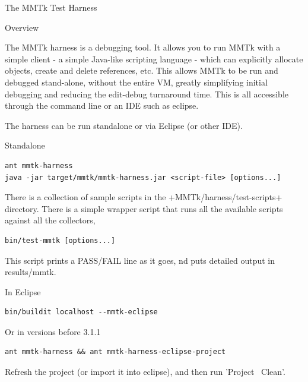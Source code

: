 \begin{section}{The MMTk Test Harness}
\label{sec:themmtktestharness}

\begin{subsection}{Overview}

The MMTk harness is a debugging tool. It allows you to run MMTk with a simple client - a simple Java-like scripting language - which can explicitly allocate objects, create and delete references, etc. This allows MMTk to be run and debugged stand-alone, without the entire VM, greatly simplifying initial debugging and reducing the edit-debug turnaround time. This is all accessible through the command line or an IDE such as eclipse.

The harness can be run standalone or via Eclipse (or other IDE).

\end{subsection}

\begin{subsection}{Standalone}

\begin{lstlisting}
ant mmtk-harness
java -jar target/mmtk/mmtk-harness.jar <script-file> [options...]
\end{lstlisting}

There is a collection of sample scripts in the \spverb+MMTk/harness/test-scripts+ directory.  There is a simple wrapper script that runs all the available scripts against all the collectors,

\begin{lstlisting}
bin/test-mmtk [options...]
\end{lstlisting}

This script prints a PASS/FAIL line as it goes, nd puts detailed output in results/mmtk.

\end{subsection}

\begin{subsection}{In Eclipse}

\begin{lstlisting}
bin/buildit localhost --mmtk-eclipse
\end{lstlisting}

Or in versions before 3.1.1

\begin{lstlisting}
ant mmtk-harness && ant mmtk-harness-eclipse-project
\end{lstlisting}

Refresh the project (or import it into eclipse), and then run 'Project \textrightarrow\ Clean'.


\end{subsection}
\end{section}
